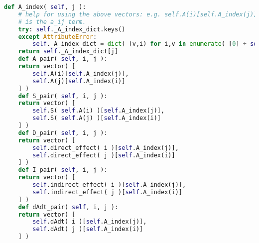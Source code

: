 \begin{lstlisting}[language=Python]
    def A_index( self, j ):
	# help for using the above vectors: e.g. self.A(i)[self.A_index(j)]
	# is the a_ij term.
	try: self._A_index_dict.keys()
	except AttributeError:
	    self._A_index_dict = dict( (v,i) for i,v in enumerate( [0] + self._lv_model._population_indices ) )
	return self._A_index_dict[j]
    def A_pair( self, i, j ):
	return vector( [
	    self.A(i)[self.A_index(j)],
	    self.A(j)[self.A_index(i)]
	] )
    def S_pair( self, i, j ):
	return vector( [
	    self.S( self.A(i) )[self.A_index(j)],
	    self.S( self.A(j) )[self.A_index(i)]
	] )
    def D_pair( self, i, j ):
	return vector( [
	    self.direct_effect( i )[self.A_index(j)],
	    self.direct_effect( j )[self.A_index(i)]
	] )
    def I_pair( self, i, j ):
	return vector( [
	    self.indirect_effect( i )[self.A_index(j)],
	    self.indirect_effect( j )[self.A_index(i)]
	] )
    def dAdt_pair( self, i, j ):
	return vector( [
	    self.dAdt( i )[self.A_index(j)],
	    self.dAdt( j )[self.A_index(i)]
	] )


\end{lstlisting}
